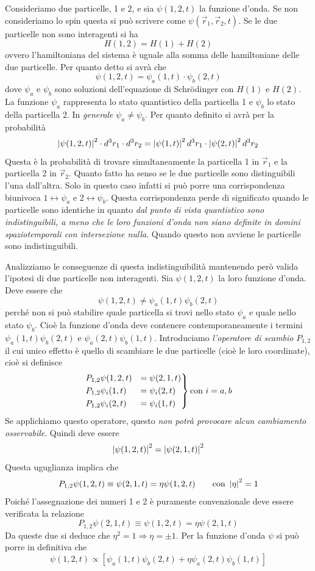 Consideriamo due particelle, 1 e 2, e sia $\psi(1,2,t)$ la funzione d'onda. Se
non consideriamo lo spin questa si può scrivere come $\psi(\vec{r}_1, 
\vec{r}_2,
t)$. Se le due particelle non sono interagenti si ha
\[
H(1,2) = H(1) + H(2)
\]
ovvero l'hamiltoniana del sistema è uguale alla somma delle hamiltoniane delle
due particelle. Per quanto detto si avrà che
\[
\psi(1,2,t) = \psi_a(1,t)\cdot \psi_b(2,t)
\]
dove $\psi_a$ e $\psi_b$ sono soluzioni dell'equazione di Schr\"odinger con
$H(1)$ e $H(2)$. La funzione $\psi_a$ rappresenta lo stato quantistico della
particella 1 e $\psi_b$ lo stato della particella 2. In \textit{generale}
$\psi_a \neq \psi_b$. Per quanto definito si avrà per la probabilità
\[
\left| \psi(1,2,t) \right|^2\cdot d^3r_1\cdot d^3r_2 = \left| \psi(1,t) \right|^2d^3r_1\cdot
\left| \psi(2,t) \right|^2d^3r_2
\]
Questa è la probabilità di trovare simultaneamente la particella 1 in
$\vec{r}_1$ e la particella 2 in $\vec{r}_2$. Quanto fatto ha senso se le due
particelle sono distinguibili l'una dall'altra. Solo in questo caso infatti si
può porre una corrispondenza biunivoca $1\leftrightarrow\psi_a$ e
$2\leftrightarrow\psi_b$. Questa corrispondenza perde di significato quando le
particelle sono identiche in quanto \textit{dal punto di vista quantistico sono
indistinguibili, a meno che le loro funzioni d'onda non siano definite in domini
spaziotemporali con intersezione nulla}. Quando questo non avviene le particelle
sono indistinguibili.

Analizziamo le conseguenze di questa indistinguibilità mantenendo però valida
l'ipotesi di due particelle non interagenti. Sia $\psi(1,2,t)$ la loro funzione
d'onda. Deve essere che
\[
\psi(1,2,t) \neq \psi_a(1,t)\psi_b(2,t)
\]
perché non si può stabilire quale particella si trovi nello stato $\psi_a$ e
quale nello stato $\psi_b$. Cioè la funzione d'onda deve contenere
contemporaneamente i termini $\psi_a(1,t)\psi_b(2,t)$ e
$\psi_a(2,t)\psi_b(1,t)$. Introduciamo \textit{l'operatore di scambio} $P_{1,2}$
il cui unico effetto è quello di scambiare le due particelle (cioè le loro
coordinate), cioè si definisce
\begin{equation}
\begin{rcases}
P_{1,2}\psi(1,2,t) &= \psi(2,1,t)\\
P_{1,2} \psi_i(1,t) &= \psi_i(2,t)\\
P_{1,2} \psi_i(2,t) &= \psi_i(1,t)
\end{rcases}\text{con }i=a,b
\end{equation}
Se applichiamo questo operatore, questo \textit{non potrà provocare alcun
cambiamento osservabile}. Quindi deve essere
\[
\left| \psi(1,2,t) \right|^2 = \left| \psi(2,1,t) \right|^2
\]
Questa uguglianza implica che
\[
P_{1,2}\psi(1,2,t) \equiv \psi(2,1,t) = \eta\psi(1,2,t)\qquad\text{con 
}\left| \eta \right|^2 = 1
\]
Poiché l'assegnazione dei numeri 1 e 2 è puramente convenzionale deve essere
verificata la relazione
\[
P_{1,2}\psi(2,1,t) \equiv \psi(1,2,t) = \eta\psi(2,1,t)
\]
Da queste due si deduce che $\eta^2=1\Rightarrow\eta=\pm 1$. Per la funzione
d'onda $\psi$ si può porre in definitiva che
\begin{equation}
\psi(1,2,t)\propto[\psi_a(1,t)\psi_b(2,t) + \eta\psi_a(2,t)\psi_b(1,t)]
\end{equation}

